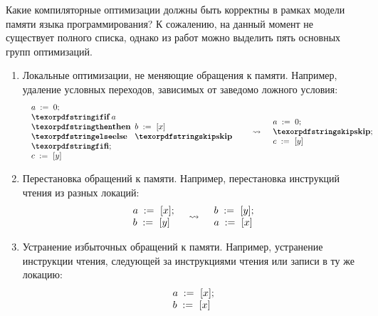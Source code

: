 Какие компиляторные оптимизации должны быть корректны в рамках модели памяти языка программирования?
К сожалению, на данный момент не существует полного списка, однако из работ
\cite{Vafeiadis-al:POPL15,Morisset-al:PLDI13,Sevcik-Aspinall:ECOOP08} можно выделить пять основных групп оптимизаций.
\begin{enumerate}
  \item Локальные оптимизации, не меняющие обращения к памяти.
    Например, удаление условных переходов, зависимых от заведомо ложного условия:
    \[
      \begin{array}{l c l}
        \begin{array}{l}
        \assignInst{a}{0}; \\
        \iteml{a}{\readInst{b}{x}}{\skipc}; \\
        \readInst{c}{y} \\
        \end{array}
        & \optarrow &
        \begin{array}{l}
          \assignInst{a}{0}; \\
          \skipc; \\
          \readInst{c}{y}
        \end{array}
      \end{array}
    \]
  \item Перестановка обращений к памяти.
    Например, перестановка инструкций чтения из разных локаций:
    \[
      \begin{array}{l c l}
        \begin{array}{l}
        a \;:=_{}\;[x]; \\
        b \;:=_{}\;[y]
        \end{array}
        & \rightsquigarrow &
        \begin{array}{l}
        b \;:=_{}\;[y]; \\
        a \;:=_{}\;[x]
        \end{array}
      \end{array}
    \]
  \item Устранение избыточных обращений к памяти.
    Например, устранение инструкции чтения, следующей за инструкциями чтения или записи в ту же локацию:
    \[
    \begin{array}{c c c}
      \begin{array}{l c l}
        \begin{array}{l}
        a \;:=_{}\;[x]; \\
        b \;:=_{}\;[x]
        \end{array}

\end{array}
\end{array}\]
\end{enumerate}
